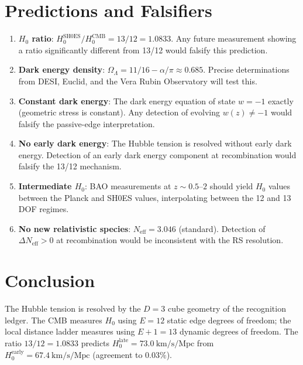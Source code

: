 \documentclass[12pt,a4paper]{article}
\theoremstyle{definition}
\theoremstyle{remark}
\begin{document}
\section{Predictions and Falsifiers}
\label{sec:predictions}

\begin{enumerate}
  \item \textbf{$H_0$ ratio}:
  $H_0^{\mathrm{SH0ES}}/H_0^{\mathrm{CMB}} = 13/12
  = 1.0833$.  Any future measurement showing a ratio
  significantly different from 13/12 would falsify this
  prediction.

  \item \textbf{Dark energy density}:
  $\Omega_\Lambda = 11/16 - \alpha/\pi \approx 0.685$.
  Precise determinations from DESI, Euclid, and the Vera
  Rubin Observatory will test this.

  \item \textbf{Constant dark energy}: The dark energy
  equation of state $w = -1$ exactly (geometric stress
  is constant).  Any detection of evolving $w(z) \neq -1$
  would falsify the passive-edge interpretation.

  \item \textbf{No early dark energy}: The Hubble tension
  is resolved without early dark energy.  Detection of
  an early dark energy component at recombination would
  falsify the 13/12 mechanism.

  \item \textbf{Intermediate $H_0$}: BAO measurements at
  $z \sim 0.5$--$2$ should yield $H_0$ values between the
  Planck and SH0ES values, interpolating between the 12
  and 13 DOF regimes.

  \item \textbf{No new relativistic species}: $N_{\mathrm{eff}}
  = 3.046$ (standard).  Detection of $\Delta N_{\mathrm{eff}}
  > 0$ at recombination would be inconsistent with the
  RS resolution.
\end{enumerate}

\section{Conclusion}
\label{sec:conclusion}

The Hubble tension is resolved by the $D = 3$ cube geometry
of the recognition ledger.  The CMB measures $H_0$ using
$E = 12$ static edge degrees of freedom; the local distance
ladder measures using $E + 1 = 13$ dynamic degrees of freedom.
The ratio $13/12 = 1.0833$ predicts
$H_0^{\mathrm{late}} = 73.0~\mathrm{km/s/Mpc}$ from
$H_0^{\mathrm{early}} = 67.4~\mathrm{km/s/Mpc}$ (agreement
to $0.03\%$).
\end{document}
